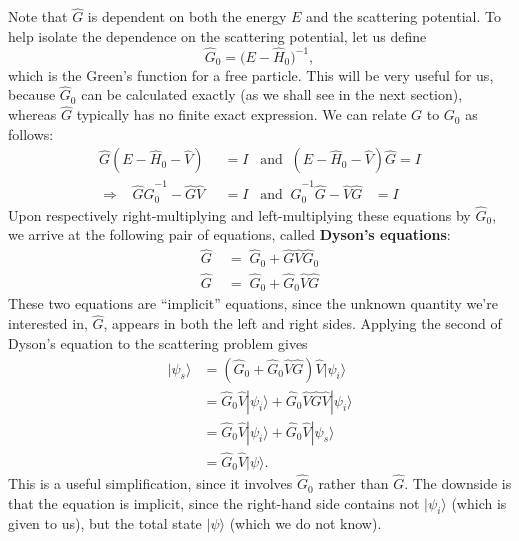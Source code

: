 \documentclass[pra,11pt]{revtex4}
\begin{document}
Note that $\hat{G}$ is dependent on both the energy $E$ and the
scattering potential.  To help isolate the dependence on the
scattering potential, let us define
$$\hat{G}_0=\big(E-\hat{H}_0\big)^{-1},$$
which is the Green's function for a free particle.  This will be very
useful for us, because $\hat{G}_0$ can be calculated exactly (as we
shall see in the next section), whereas $\hat{G}$ typically has no
finite exact expression.  We can relate $G$ to $G_0$ as follows:
$$\begin{aligned}\hat{G}(E-\hat{H}_0 - \hat{V})\;\; &= I \;\;\;\mathrm{and}\;\; (E-\hat{H}_0 - \hat{V})\hat{G} = I \\ \Rightarrow \;\;\; \hat{G} \hat{G}_0^{-1} - \hat{G}\hat{V} &= I \;\;\; \mathrm{and}\;\; \hat{G}_0^{-1} \hat{G} - \hat{V}\hat{G} \;\;\;= I\end{aligned}$$
Upon respectively right-multiplying and left-multiplying these equations
by $\hat{G}_0$, we arrive at the following pair of equations, called
\textbf{Dyson's equations}:
$$\boxed{\begin{aligned} \;\;\hat{G} \;&= \; \hat{G}_0 + \hat{G}\hat{V}\hat{G}_0\;\; \\ \;\;\hat{G} \;&=\; \hat{G}_0 + \hat{G}_0\hat{V}\hat{G} \;\;\end{aligned}}$$
These two equations are ``implicit'' equations, since the unknown
quantity we're interested in, $\hat{G}$, appears in both the left and
right sides.  Applying the second of Dyson's equation to the
scattering problem gives
$$\begin{aligned}|\psi_s\rangle &= \left(\hat{G}_0 + \hat{G}_0\hat{V}\hat{G}\right) \hat{V} |\psi_i\rangle \\ &= \hat{G}_0 \hat{V} |\psi_i\rangle + \hat{G}_0\hat{V}\hat{G} \hat{V} |\psi_i\rangle \\ &= \hat{G}_0 \hat{V} |\psi_i\rangle + \hat{G}_0\hat{V} |\psi_s\rangle \\ &= \hat{G}_0\hat{V} |\psi\rangle.\end{aligned}$$
This is a useful simplification, since it involves $\hat{G}_0$ rather
than $\hat{G}$.  The downside is that the equation is implicit, since
the right-hand side contains not $|\psi_i\rangle$ (which is given to
us), but the total state $|\psi\rangle$ (which we do not know).
\end{document}
